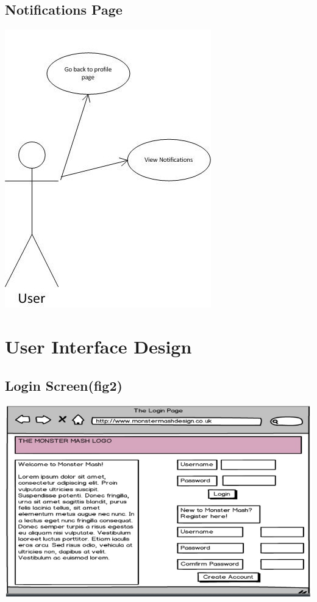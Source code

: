 \documentclass{project}
\begin{document}
\subsection{Notifications Page}
\includegraphics[scale=0.6]{NotificationsPageUseCase.jpg}

\section{User Interface Design}

\subsection{Login Screen(fig2)}
\includegraphics[scale=0.6]{loginPage.jpg}
\end{document}
